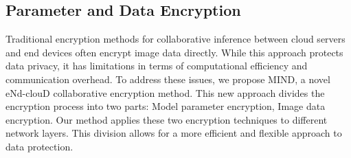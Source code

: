 \documentclass[conference]{IEEEtran}
\begin{document}


 \subsection{Parameter and Data Encryption}
Traditional encryption methods for collaborative inference between cloud servers and end devices often encrypt image data directly. While this approach protects data privacy, it has limitations in terms of computational efficiency and communication overhead. To address these issues, we propose MIND, a novel eNd-clouD collaborative encryption method. This new approach divides the encryption process into two parts: Model parameter encryption, Image data encryption. Our method applies these two encryption techniques to different network layers. This division allows for a more efficient and flexible approach to data protection.
\end{document}

